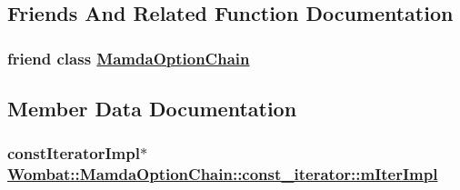 \subsection{Friends And Related Function Documentation}
\hypertarget{classWombat_1_1MamdaOptionChain_1_1const__iterator_f3175431d241ba2aa4df7e41301ee186}{
\subsubsection[MamdaOptionChain]{\setlength{\rightskip}{0pt plus 5cm}friend class \hyperlink{classWombat_1_1MamdaOptionChain}{Mamda\-Option\-Chain}}}
\label{classWombat_1_1MamdaOptionChain_1_1const__iterator_f3175431d241ba2aa4df7e41301ee186}




\subsection{Member Data Documentation}
\hypertarget{classWombat_1_1MamdaOptionChain_1_1const__iterator_6fc0ae3174bf31e265d256579103fe36}{
\subsubsection[mIterImpl]{\setlength{\rightskip}{0pt plus 5cm}const\-Iterator\-Impl$\ast$ \hyperlink{classWombat_1_1MamdaOptionChain_1_1const__iterator_6fc0ae3174bf31e265d256579103fe36}{Wombat::Mamda\-Option\-Chain::const\_\-iterator::m\-Iter\-Impl}}}
\label{classWombat_1_1MamdaOptionChain_1_1const__iterator_6fc0ae3174bf31e265d256579103fe36}


